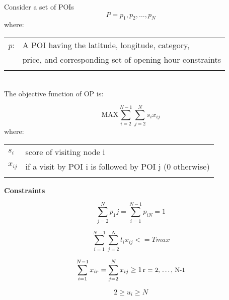 


\setlength{\tabcolsep}{20pt}

Consider a set of POIs \[P = {p_1,p_2,\ldots,p_N}\]
where:
\\

\begin{tabular}{l l}


\textit{p}:  &  A POI having the latitude, longitude, category,\\
 & price, and corresponding set of opening hour constraints \\
 &\\
\end{tabular}
\\
The objective function of OP is:

\[ \text{MAX}  \sum_{i=2}^{N-1} \sum_{j=2}^{N} {s_i}{x_{ij}} \]
where:
\\
\begin{tabular}{l l}
\textit{$s_i$} & score of visiting node i \\
\textit{$x_{ij}$} & if a visit by POI i is followed by POI j (0 otherwise)\\

                  & \\
\end{tabular}


\textbf{Constraints} 

\begin{multicols}{2}
\begin{equation} 
    \label{constraintOne}
    \sum_{j=2}^{N} p_1j = \sum_{i=1}^{N-1} p_{iN}= 1
\end{equation}

\begin{equation} 
    \label{constraintTwo}
    \sum_{i=1}^{N-1} \sum_{j=2}^{N} t_{i}x_{ij}<= Tmax
\end{equation}


\end{multicols}

\begin{multicols}{2}

\begin{equation} 
    \label{constraintThree}
    \sum_{i=1}^{N-1} x_{ir} = \sum_{j=2}^{N} x_{ij} \geq 1 \, \text{\small{r = 2, \ldots, N-1}}
\end{equation}

\begin{equation} 
    \label{constraintFour}
    2 \geq u_i \geq N 
\end{equation}
\end{multicols}


